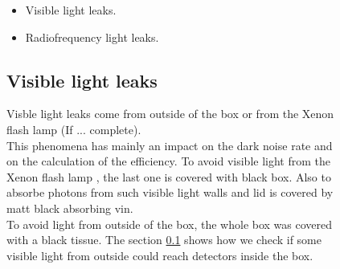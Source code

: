 \documentclass[a4paper, 11pt]{report}%
\newcommand{\xfl}{Xenon flash lamp }
\begin{document}
\begin{figure}[!hbtp]
  \begin{itemize}
   \item Visible light leaks.
   \item Radiofrequency light leaks.   
  \end{itemize}
  
  \subsection{Visible light leaks}
  
  Visble light leaks come from outside of the box or from the \xfl (If ... complete).\\
  This phenomena has mainly an impact on the dark noise rate and on the calculation of the efficiency.
  To avoid visible light from the \xfl, the last one is covered with black box. Also to absorbe photons from such visible light
  walls and lid is covered by matt black absorbing vin.\\
  To avoid light from outside of the box, the whole box was covered with a black tissue. The section \ref{} shows how we check if some
  visible light from outside could reach detectors inside the box. 
  

\end{figure}
\end{document}
